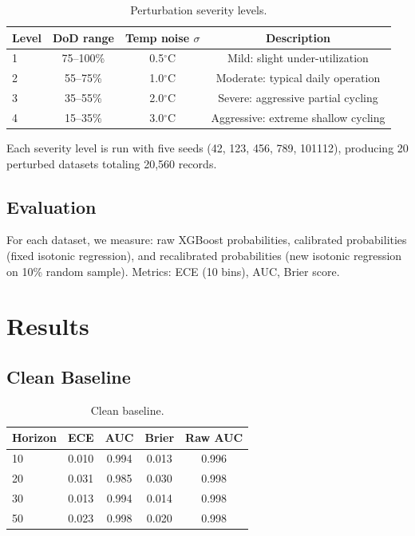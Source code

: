 \documentclass[11pt,a4paper]{article}
\begin{document}
\begin{table}[htbp]
\centering
\caption{Perturbation severity levels.}
\label{tab:severity}
\begin{tabular}{@{}lccc@{}}
\toprule
Level & DoD range & Temp noise $\sigma$ & Description \\
\midrule
1 & 75--100\% & 0.5$^\circ$C & Mild: slight under-utilization \\
2 & 55--75\% & 1.0$^\circ$C & Moderate: typical daily operation \\
3 & 35--55\% & 2.0$^\circ$C & Severe: aggressive partial cycling \\
4 & 15--35\% & 3.0$^\circ$C & Aggressive: extreme shallow cycling \\
\bottomrule
\end{tabular}
\end{table}

Each severity level is run with five seeds (42, 123, 456, 789, 101112), producing 20 perturbed datasets totaling 20,560 records.

\subsection{Evaluation}

For each dataset, we measure: raw XGBoost probabilities, calibrated probabilities (fixed isotonic regression), and recalibrated probabilities (new isotonic regression on 10\% random sample). Metrics: ECE (10 bins), AUC, Brier score.

\section{Results}\label{sec:results}

\subsection{Clean Baseline}

\begin{table}[htbp]
\centering
\caption{Clean baseline.}
\label{tab:clean}
\begin{tabular}{@{}lcccc@{}}
\toprule
Horizon & ECE & AUC & Brier & Raw AUC \\
\midrule
10 & 0.010 & 0.994 & 0.013 & 0.996 \\
20 & 0.031 & 0.985 & 0.030 & 0.998 \\
30 & 0.013 & 0.994 & 0.014 & 0.998 \\
50 & 0.023 & 0.998 & 0.020 & 0.998 \\
\bottomrule
\end{tabular}
\end{table}
\end{document}
